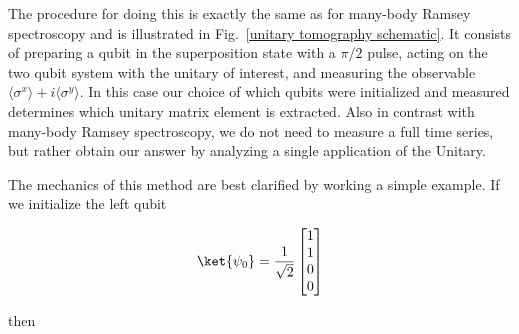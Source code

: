 The procedure for doing this is exactly the same as for many-body Ramsey spectroscopy and is illustrated in Fig.~\ref{unitary tomography schematic}.
It consists of preparing a qubit in the superposition state with a $\pi / 2$ pulse,
acting on the two qubit system with the unitary of interest,
and measuring the observable $\langle \sigma^x \rangle + i \langle \sigma^y \rangle$.
In this case our choice of which qubits were initialized and measured determines which unitary matrix element is extracted.
Also in contrast with many-body Ramsey spectroscopy, we do not need to measure a full time series, but rather obtain our answer by analyzing a single application of the Unitary.



The mechanics of this method are best clarified by working a simple example.
If we initialize the left qubit

\begin{equation}
    \ket{\psi_0}=\frac{1}{\sqrt{2}}
    \begin{bmatrix}
        1 \\
        1 \\
        0 \\
        0 \\
    \end{bmatrix}
\end{equation}

then

